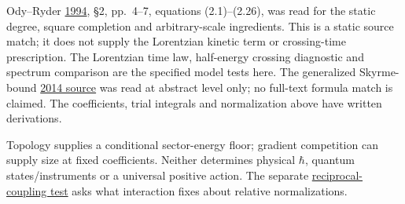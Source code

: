 \documentclass[11pt,a4paper]{article}
\begin{document}
Ody--Ryder \href{https://arxiv.org/abs/hep-th/9402137v1}{1994}, §2,
pp.~4--7, equations (2.1)--(2.26), was read for the static degree,
square completion and arbitrary-scale ingredients. This is a static
source match; it does not supply the Lorentzian kinetic term or
crossing-time prescription. The Lorentzian time law, half-energy
crossing diagnostic and spectrum comparison are the specified model
tests here. The generalized Skyrme-bound
\href{https://arxiv.org/abs/1311.2939}{2014 source} was read at abstract
level only; no full-text formula match is claimed. The coefficients,
trial integrals and normalization above have written derivations.

Topology supplies a conditional sector-energy floor; gradient
competition can supply size at fixed coefficients. Neither determines
physical \(\hbar\), quantum states/instruments or a universal positive
action. The separate
\href{rotation-composition-universality.md\#reciprocal-mechanical-calibration}{reciprocal-coupling
test} asks what interaction fixes about relative normalizations.
\end{document}

